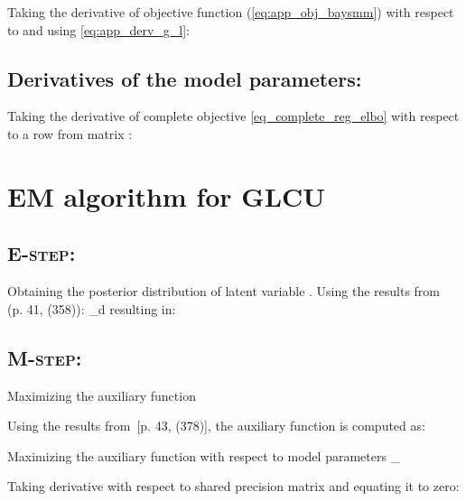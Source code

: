 \documentclass[journal]{IEEEtran}
\newcommand{\mb}[1]{\bm{#1}}
\newcommand{\bs}[1]{\bm{#1}}
\def\vu{{\mb{u}}}
\def\vmu{{\bs{\mu}}}
\def\mM{{\mb{M}}}
\begin{document}
Taking the derivative of objective function (\eqref{eq:app_obj_baysmm}) with 
respect to  and using \eqref{eq:app_derv_g_l}:
 


\subsection*{Derivatives of the model parameters:}
Taking the derivative of complete objective \eqref{eq_complete_reg_elbo} with 
respect to a row  from matrix :


%
 
\section{EM algorithm for GLCU}

\subsection*{\textsc{E-step}:}
 Obtaining the posterior distribution of latent variable . Using the results from~\cite{cookbook} (p. 41,  (358)):
\vu_d
\noindent resulting in:

\subsection*{\textsc{M-step}:}
Maximizing the auxiliary function


\noindent Using the results from~\cite{cookbook}[p. 43,  (378)], the auxiliary 
function  is computed as:

Maximizing the auxiliary function  with respect to model parameters 
\vmu_{\ell}\mM

Taking derivative with respect to shared precision matrix  and equating it to zero:


 





\ifCLASSOPTIONcaptionsoff
  \newpage
\fi









\end{document}
